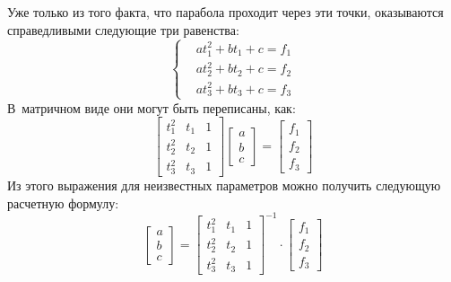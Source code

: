 \documentclass[12pt,a4paper,openany]{extarticle}
\begin{document}
Уже только из того факта, что парабола проходит через эти точки, оказываются справедливыми следующие три равенства:
\begin{equation}\label{eq:parabolas_in_point_eqs}
	\left\{  
	\begin{aligned}
		\!&a t_1^2 + b t_1 + c = f_1\\
		\!&a t_2^2 + b t_2 + c = f_2\\
		\!&a t_3^2 + b t_3 + c = f_3
	\end{aligned}   
	\right.
\end{equation}
В~матричном виде они могут быть переписаны, как:
\begin{equation}
\begin{bmatrix}
t_1^2 & t_1 & 1\\
t_2^2 & t_2 & 1\\
t_3^2 & t_3 & 1
\end{bmatrix}
\begin{bmatrix}
a \\ b \\ c
\end{bmatrix}
=
\begin{bmatrix}
f_1 \\ f_2 \\ f_3
\end{bmatrix}
\end{equation}
Из этого выражения для неизвестных параметров можно получить следующую расчетную формулу:
\begin{equation}\label{eq:a_b_c_finder}
\begin{bmatrix}
a \\ b \\ c
\end{bmatrix}
=
\begin{bmatrix}
t_1^2 & t_1 & 1\\
t_2^2 & t_2 & 1\\
t_3^2 & t_3 & 1
\end{bmatrix}^{-1}\cdot
\begin{bmatrix}
f_1 \\ f_2 \\ f_3
\end{bmatrix}
\end{equation}
\end{document}
